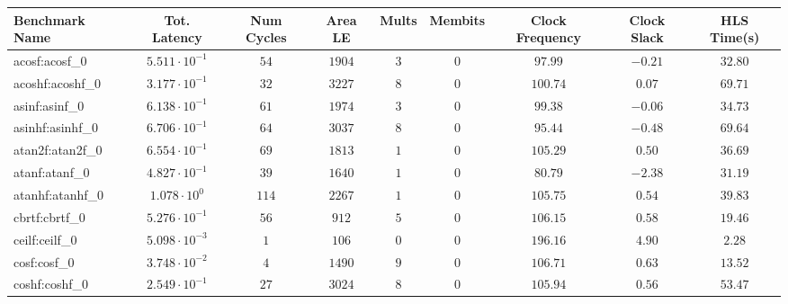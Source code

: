 \begin{tabular}{|l|c|c|c|c|c|c|c|c|}
\hline
Benchmark Name               & Tot. Latency            & Num Cycles & Area LE   & Mults   & Membits    & Clock Frequency & Clock Slack & HLS Time(s) \\
\hline
acosf:acosf\_0               & $ 5.511 \cdot 10^{-1} $ & $ 54     $ & $ 1904  $ & $ 3   $ & $ 0      $ & $ 97.99       $ & $ -0.21   $ & $ 32.80   $ \\
acoshf:acoshf\_0             & $ 3.177 \cdot 10^{-1} $ & $ 32     $ & $ 3227  $ & $ 8   $ & $ 0      $ & $ 100.74      $ & $ 0.07    $ & $ 69.71   $ \\
asinf:asinf\_0               & $ 6.138 \cdot 10^{-1} $ & $ 61     $ & $ 1974  $ & $ 3   $ & $ 0      $ & $ 99.38       $ & $ -0.06   $ & $ 34.73   $ \\
asinhf:asinhf\_0             & $ 6.706 \cdot 10^{-1} $ & $ 64     $ & $ 3037  $ & $ 8   $ & $ 0      $ & $ 95.44       $ & $ -0.48   $ & $ 69.64   $ \\
atan2f:atan2f\_0             & $ 6.554 \cdot 10^{-1} $ & $ 69     $ & $ 1813  $ & $ 1   $ & $ 0      $ & $ 105.29      $ & $ 0.50    $ & $ 36.69   $ \\
atanf:atanf\_0               & $ 4.827 \cdot 10^{-1} $ & $ 39     $ & $ 1640  $ & $ 1   $ & $ 0      $ & $ 80.79       $ & $ -2.38   $ & $ 31.19   $ \\
atanhf:atanhf\_0             & $ 1.078 \cdot 10^{0}  $ & $ 114    $ & $ 2267  $ & $ 1   $ & $ 0      $ & $ 105.75      $ & $ 0.54    $ & $ 39.83   $ \\
cbrtf:cbrtf\_0               & $ 5.276 \cdot 10^{-1} $ & $ 56     $ & $ 912   $ & $ 5   $ & $ 0      $ & $ 106.15      $ & $ 0.58    $ & $ 19.46   $ \\
ceilf:ceilf\_0               & $ 5.098 \cdot 10^{-3} $ & $ 1      $ & $ 106   $ & $ 0   $ & $ 0      $ & $ 196.16      $ & $ 4.90    $ & $ 2.28    $ \\
cosf:cosf\_0                 & $ 3.748 \cdot 10^{-2} $ & $ 4      $ & $ 1490  $ & $ 9   $ & $ 0      $ & $ 106.71      $ & $ 0.63    $ & $ 13.52   $ \\
coshf:coshf\_0               & $ 2.549 \cdot 10^{-1} $ & $ 27     $ & $ 3024  $ & $ 8   $ & $ 0      $ & $ 105.94      $ & $ 0.56    $ & $ 53.47   $ \\

\end{tabular}
